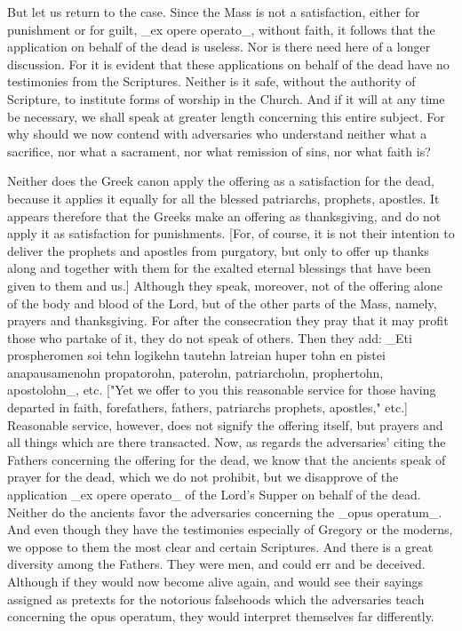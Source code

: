 But let us return to the case.  Since the Mass is not a satisfaction,
either for punishment or for guilt, _ex opere operato_, without faith,
it follows that the application on behalf of the dead is useless.
Nor is there need here of a longer discussion.  For it is evident
that these applications on behalf of the dead have no testimonies
from the Scriptures.  Neither is it safe, without the authority of
Scripture, to institute forms of worship in the Church.  And if it
will at any time be necessary, we shall speak at greater length
concerning this entire subject.  For why should we now contend with
adversaries who understand neither what a sacrifice, nor what a
sacrament, nor what remission of sins, nor what faith is?

Neither does the Greek canon apply the offering as a satisfaction for
the dead, because it applies it equally for all the blessed
patriarchs, prophets, apostles.  It appears therefore that the Greeks
make an offering as thanksgiving, and do not apply it as satisfaction
for punishments.  [For, of course, it is not their intention to
deliver the prophets and apostles from purgatory, but only to offer
up thanks along and together with them for the exalted eternal
blessings that have been given to them and us.] Although they speak,
moreover, not of the offering alone of the body and blood of the Lord,
but of the other parts of the Mass, namely, prayers and thanksgiving.
For after the consecration they pray that it may profit those who
partake of it, they do not speak of others.  Then they add: _Eti
prospheromen soi tehn logikehn tautehn latreian huper tohn en pistei
anapausamenohn propatorohn, paterohn, patriarchohn, prophertohn,
apostolohn_, etc. ["Yet we offer to you this reasonable service for
those having departed in faith, forefathers, fathers, patriarchs
prophets, apostles," etc.] Reasonable service, however, does not
signify the offering itself, but prayers and all things which are
there transacted.  Now, as regards the adversaries' citing the
Fathers concerning the offering for the dead, we know that the
ancients speak of prayer for the dead, which we do not prohibit, but
we disapprove of the application _ex opere operato_ of the Lord's
Supper on behalf of the dead.  Neither do the ancients favor the
adversaries concerning the _opus operatum_.  And even though they
have the testimonies especially of Gregory or the moderns, we oppose
to them the most clear and certain Scriptures.  And there is a great
diversity among the Fathers.  They were men, and could err and be
deceived.  Although if they would now become alive again, and would
see their sayings assigned as pretexts for the notorious falsehoods
which the adversaries teach concerning the opus operatum, they would
interpret themselves far differently.

